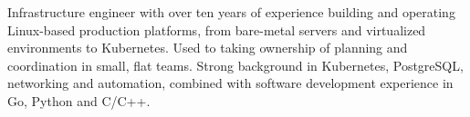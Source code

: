 Infrastructure engineer with over ten years of experience building and
operating Linux-based production platforms, from bare-metal servers and
virtualized environments to Kubernetes. Used to taking ownership of
planning and coordination in small, flat teams. Strong background in Kubernetes,
PostgreSQL, networking and automation, combined with software development
experience in Go, Python and C/C++.
